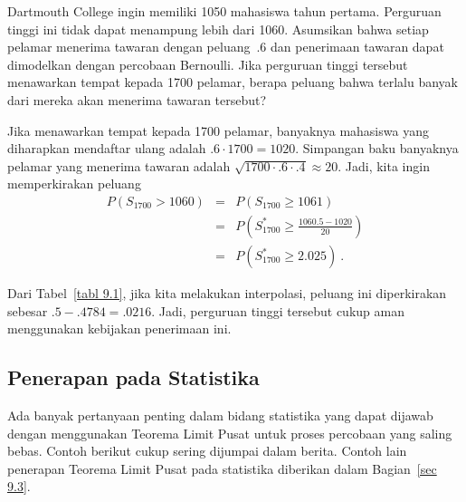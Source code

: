 \begin{example}\label{exam 9.3}
Dartmouth College ingin memiliki 1050 mahasiswa tahun pertama.  Perguruan tinggi ini tidak dapat
menampung lebih dari 1060.  Asumsikan bahwa setiap pelamar menerima tawaran dengan
peluang~.6 dan penerimaan tawaran dapat dimodelkan dengan percobaan Bernoulli. 
Jika perguruan tinggi tersebut menawarkan tempat kepada 1700 pelamar, berapa peluang bahwa terlalu
banyak dari mereka akan menerima tawaran tersebut?
\par
Jika menawarkan tempat kepada 1700 pelamar, banyaknya mahasiswa yang diharapkan mendaftar ulang adalah
$.6 \cdot 1700 = 1020$.  Simpangan baku banyaknya pelamar yang menerima tawaran adalah
$\sqrt{1700 \cdot .6 \cdot .4} \approx 20$.  Jadi, kita ingin memperkirakan
peluang
\begin{eqnarray*}
P(S_{1700} > 1060) &=& P(S_{1700} \ge 1061) \\
&=& P\left( S_{1700}^* \ge \frac {1060.5 - 1020}{20} \right) \\
                   &=& P(S_{1700}^* \ge 2.025)\ .
\end{eqnarray*}

Dari Tabel~\ref{tabl 9.1}, jika kita melakukan interpolasi, peluang ini diperkirakan
sebesar $.5 - .4784 = .0216$.  Jadi, perguruan tinggi tersebut cukup aman menggunakan
kebijakan penerimaan ini.
\end{example}


\subsection*{Penerapan pada Statistika}
Ada banyak pertanyaan penting dalam bidang statistika yang dapat dijawab dengan menggunakan
Teorema Limit Pusat untuk proses percobaan yang saling bebas.  Contoh berikut cukup
sering dijumpai dalam berita.  Contoh lain penerapan Teorema
Limit Pusat pada statistika diberikan dalam Bagian~\ref{sec 9.3}.


